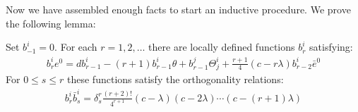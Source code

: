 Now we have assembled enough facts to start an inductive procedure.  We prove the following lemma:

\begin{lem} Set $b^i_{-1} = 0$. For each $r = 1,2, \ldots$ there are locally defined functions $b^i_r$ satisfying:
%
\begin{align}
b^i_r e^0 = d b^i_{r-1} - (r + 1) b^i_{r-1} \theta + b^j_{r-1} \Theta^i_j + \frac{r + 1}{4} (c - r \lambda) b^i_{r-2} \bar{e}^0
\end{align}
%
For $0 \leq s \leq r$ these functions satisfy the orthogonality relations:
%
\begin{align}
b^i_r \bar{b}^i_s = \delta^r_s \frac{(r + 2)!}{4^{r + 1}} (c - \lambda)(c - 2 \lambda) \cdots (c - (r+1) \lambda)
\end{align}
%
\end{lem}

